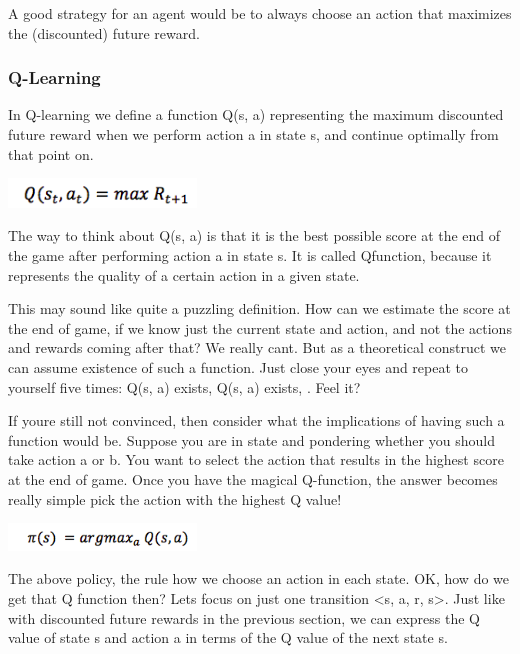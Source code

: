\documentclass[a4paper,11pt]{article}
\begin{document}
				A good strategy for an agent would be to always choose an action that maximizes the (discounted) future reward.
			\subsubsection{Q-Learning}
				In Q-learning we define a function Q(s, a) representing the maximum discounted future reward when we perform action a in state s, and continue optimally from that point on.

				\begin{centering}
				\includegraphics[width=5cm]{../Design/images/q.png}\\
				\end{centering}
				The way to think about Q(s, a) is that it is the best possible score at the end of the game after performing action a in state s. It is called Qfunction, because it represents the quality of a certain action in a given state.

				This may sound like quite a puzzling definition. How can we estimate the score at the end of game, if we know just the current state and action, and not the actions and rewards coming after that? We really cant. But as a theoretical construct we can assume existence of such a function. Just close your eyes and repeat to yourself five times: Q(s, a) exists, Q(s, a) exists, . Feel it?

				If youre still not convinced, then consider what the implications of having such a function would be. Suppose you are in state and pondering whether you should take action a or b. You want to select the action that results in the highest score at the end of game. Once you have the magical Q-function, the answer becomes really simple pick the action with the highest Q value!

				\begin{centering}
				\includegraphics[width=5cm]{../Design/images/q2.png}\\
				\end{centering}

				The above policy, the rule how we choose an action in each state.
				OK, how do we get that Q function then? Lets focus on just one transition <s, a, r, s>. Just like with discounted future rewards in the previous section, we can express the Q value of state s and action a in terms of the Q value of the next state s.
\end{document}
